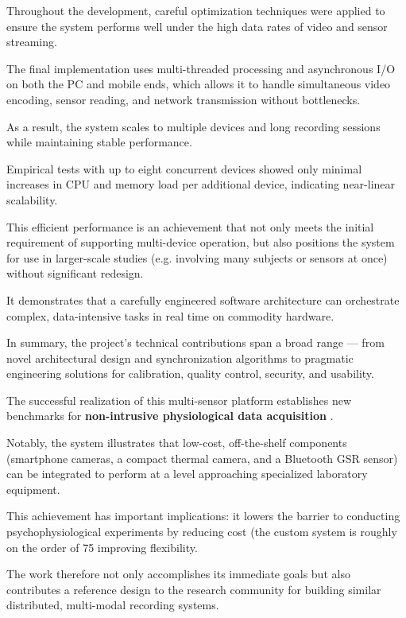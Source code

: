 \begin{itemize}
Throughout the development, careful optimization techniques were applied to ensure
the system performs well under the high data rates of video and sensor streaming.

The final implementation uses multi-threaded processing and asynchronous I/O on both
the PC and mobile ends, which allows it to handle simultaneous video encoding, sensor
reading, and network transmission without bottlenecks.

As a result, the system scales to multiple devices and long recording sessions while
maintaining stable performance.

Empirical tests with up to eight concurrent devices showed only minimal increases in
CPU and memory load per additional device, indicating near-linear scalability.

This efficient performance is an achievement that not only meets the initial
requirement of supporting multi-device operation, but also positions the system for
use in larger-scale studies (e.g.  involving many subjects or sensors at once)
without significant redesign.

It demonstrates that a carefully engineered software architecture can orchestrate
complex, data-intensive tasks in real time on commodity hardware.

\end{itemize}

In summary, the project's technical contributions span a broad range --- from novel
architectural design and synchronization algorithms to pragmatic engineering
solutions for calibration, quality control, security, and usability.

The successful realization of this multi-sensor platform establishes new benchmarks
for \textbf{non-intrusive physiological data acquisition}
.

Notably, the system illustrates that low-cost, off-the-shelf components (smartphone
cameras, a compact thermal camera, and a Bluetooth GSR sensor) can be integrated to
perform at a level approaching specialized laboratory equipment.

This achievement has important implications: it lowers the barrier to conducting
psychophysiological experiments by reducing cost (the custom system is
roughly on the order of 75%
improving flexibility.

The work therefore not only accomplishes its immediate goals but also contributes a
reference design to the research community for building similar distributed,
multi-modal recording systems.

